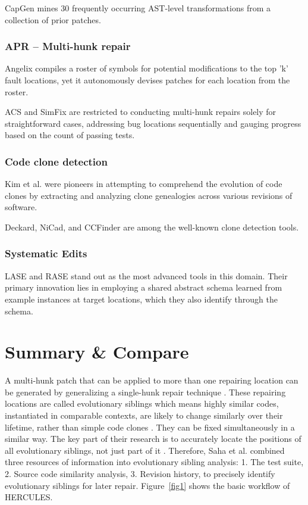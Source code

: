 \documentclass[runningheads]{llncs}
\begin{document}
CapGen mines 30 frequently occurring AST-level transformations from a collection of prior patches.

\subsubsection{APR – Multi-hunk repair\\}
Angelix compiles a roster of symbols for potential modifications to the top 'k' fault locations, yet it autonomously devises patches for each location from the roster.

ACS and SimFix are restricted to conducting multi-hunk repairs solely for straightforward cases, addressing bug locations sequentially and gauging progress based on the count of passing tests.

\subsubsection{Code clone detection\\}
Kim et al. \cite{8_ref_article3} were pioneers in attempting to comprehend the evolution of code clones by extracting and analyzing clone genealogies across various revisions of software.

Deckard, NiCad, and CCFinder are among the well-known clone detection tools.

\subsubsection{Systematic Edits\\} 
LASE and RASE stand out as the most advanced tools in this domain. Their primary innovation lies in employing a shared abstract schema learned from example instances at target locations, which they also identify through the schema.

\section{Summary \& Compare}
A multi-hunk patch that can be applied to more than one repairing location can be generated by generalizing a single-hunk repair technique \cite{0_ref_proc1}. These repairing locations are called evolutionary siblings which means highly similar codes, instantiated in comparable contexts, are likely to change similarly over their lifetime, rather than simple code clones \cite{0_ref_proc1}. They can be fixed simultaneously in a similar way. The key part of their research is to accurately locate the positions of all evolutionary siblings, not just part of it \cite{0_ref_proc1}. Therefore, Saha et al. combined three resources of information into evolutionary sibling analysis: 1. The test suite, 2. Source code similarity analysis, 3. Revision history, to precisely identify evolutionary siblings for later repair.
Figure~\ref{fig1} shows the basic workflow of HERCULES.
\end{document}
